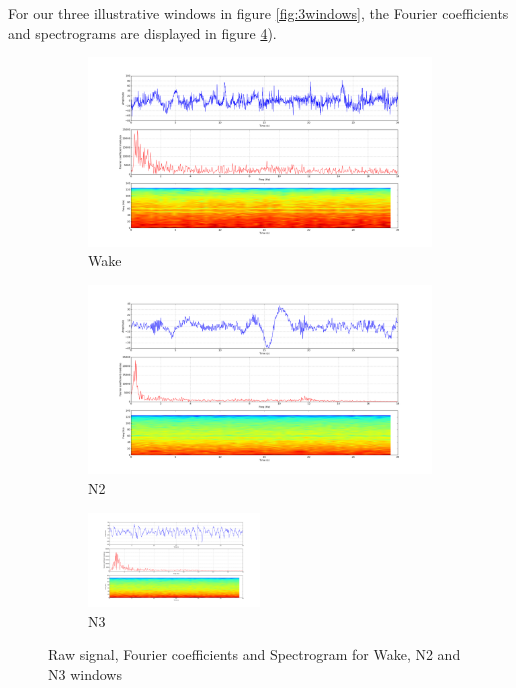 \documentclass[12pt]{report}
\begin{document}
For our three illustrative windows in figure \ref{fig:3windows}, the Fourier coefficients and spectrograms are displayed in figure \ref{fig:3winsows_fft}).

\begin{figure}[H]
\begin{subfigure}{0.5\textwidth}
	\centering
	\includegraphics[width=1\textwidth]{img/chap2/wake_fft.png}
	\caption{Wake}
	\label{fig:wake_fft}
\end{subfigure}
\begin{subfigure}{0.5\textwidth}
	\centering
	\includegraphics[width=1\textwidth]{img/chap2/n2_fft.png}
	\caption{N2}
	\label{fig:n2_fft}
\end{subfigure}

\begin{subfigure}{1.\textwidth}
	\centering
	\includegraphics[width=0.5\textwidth]{img/chap2/n3_fft.png}
	\caption{N3}
	\label{fig:n3_fft}
\end{subfigure}

\caption{\label{fig:3winsows_fft}Raw signal, Fourier coefficients and Spectrogram for Wake, N2 and N3 windows}
\end{figure}
\end{document}
